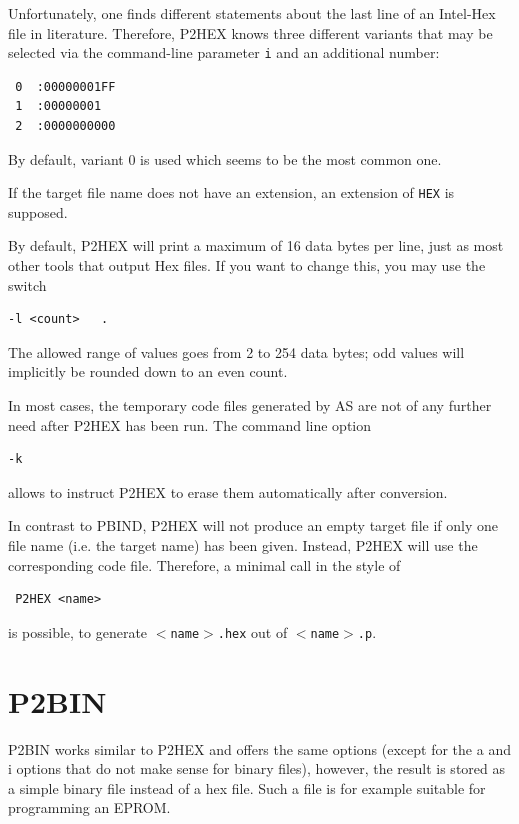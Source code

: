 \documentclass[12pt,twoside]{report}
\newcommand{\tty}[1]{{\tt #1}}
\newcommand{\asname}{{AS}}
\begin{document}
Unfortunately, one finds different statements about the last line of
an Intel-Hex file in literature.  Therefore, P2HEX knows three
different variants that may be selected via the command-line
parameter \tty{i} and an additional number:
\begin{verbatim}
 0  :00000001FF
 1  :00000001
 2  :0000000000
\end{verbatim}
By default, variant 0 is used which seems to be the most common one.

If the target file name does not have an extension, an extension of
\tty{HEX} is supposed.

By default, P2HEX will print a maximum of 16 data bytes per line,
just as most other tools that output Hex files.  If you want to
change this, you may use the switch
\begin{verbatim}
-l <count>   .
\end{verbatim}
The allowed range of values goes from 2 to 254 data bytes; odd values
will implicitly be rounded down to an even count.

In most cases, the temporary code files generated by \asname{} are not of
any further need after P2HEX has been run.  The command line option
\begin{verbatim}
-k
\end{verbatim}
allows to instruct P2HEX to erase them automatically after
conversion.

In contrast to PBIND, P2HEX will not produce an empty target file if
only one file name (i.e. the target name) has been given.  Instead,
P2HEX will use the corresponding code file.  Therefore, a minimal
call in the style of
\begin{verbatim}
 P2HEX <name>
\end{verbatim}
is possible, to generate \tty{$<$name$>$.hex} out of \tty{$<$name$>$.p}.


\section{P2BIN}

P2BIN works similar to P2HEX and offers the same options (except for
the a and i options that do not make sense for binary files),
however, the result is stored as a simple binary file instead of a
hex file.  Such a file is for example suitable for programming an
EPROM.
\end{document}
